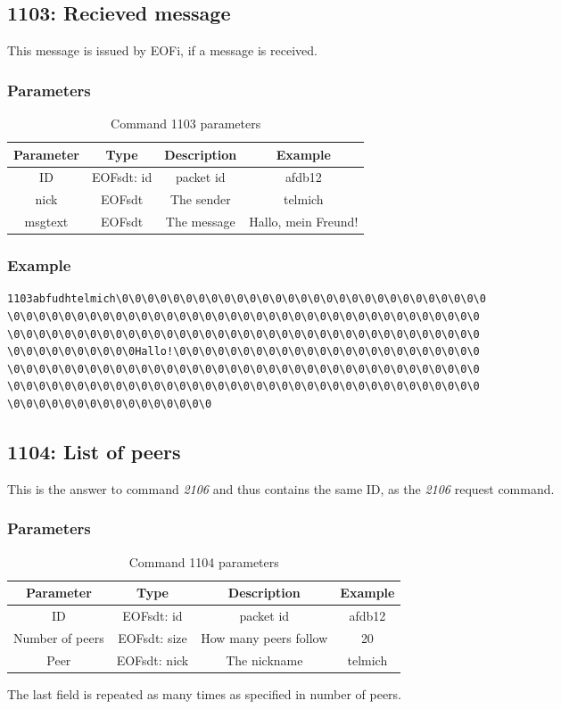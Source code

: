 \documentclass[12pt,a4paper]{book}
\begin{document}
\subsection{1103: Recieved message}
This message is issued by EOFi, if a message is received.
\subsubsection{Parameters}
\begin{longtable}{|c|c|c|c|}
\caption{Command 1103 parameters}\\
\hline
\textbf{Parameter} & \textbf{Type} & \textbf{Description} & \textbf{Example}\\
\hline
ID & EOFsdt: id & packet id & afdb12\\
\hline
nick & EOFsdt & The sender & telmich\\
\hline
msgtext & EOFsdt & The message & Hallo, mein Freund!\\
\hline
\end{longtable}
\subsubsection{Example}
\begin{verbatim}
1103abfudhtelmich\0\0\0\0\0\0\0\0\0\0\0\0\0\0\0\0\0\0\0\0\0\0\0\0\0\0\0\0\0
\0\0\0\0\0\0\0\0\0\0\0\0\0\0\0\0\0\0\0\0\0\0\0\0\0\0\0\0\0\0\0\0\0\0\0\0\0
\0\0\0\0\0\0\0\0\0\0\0\0\0\0\0\0\0\0\0\0\0\0\0\0\0\0\0\0\0\0\0\0\0\0\0\0\0
\0\0\0\0\0\0\0\0\0\0Hallo!\0\0\0\0\0\0\0\0\0\0\0\0\0\0\0\0\0\0\0\0\0\0\0\0
\0\0\0\0\0\0\0\0\0\0\0\0\0\0\0\0\0\0\0\0\0\0\0\0\0\0\0\0\0\0\0\0\0\0\0\0\0
\0\0\0\0\0\0\0\0\0\0\0\0\0\0\0\0\0\0\0\0\0\0\0\0\0\0\0\0\0\0\0\0\0\0\0\0\0
\0\0\0\0\0\0\0\0\0\0\0\0\0\0\0\0
\end{verbatim}
\subsection{1104: List of peers}
This is the answer to command \emph{2106} and thus contains the
same ID, as the \emph{2106} request command.
\subsubsection{Parameters}
\begin{longtable}{|c|c|c|c|}
\caption{Command 1104 parameters}\\
\hline
\textbf{Parameter} & \textbf{Type} & \textbf{Description} & \textbf{Example}\\
\hline
ID & EOFsdt: id & packet id & afdb12\\
\hline
Number of peers & EOFsdt: size & How many peers follow & 20\\
\hline
Peer & EOFsdt: nick & The nickname & telmich\\
\hline
\end{longtable}
The last field is repeated as many times as specified in number of peers.
\end{document}
